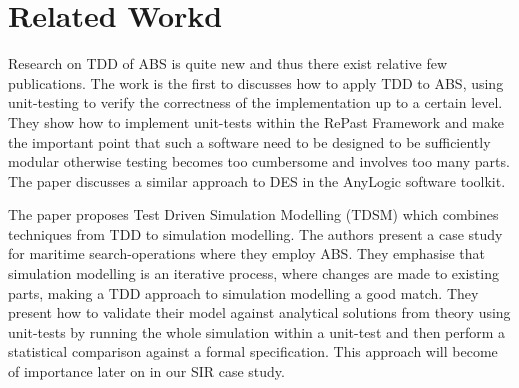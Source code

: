 \section{Related Workd}
\label{sec:related}

Research on TDD of ABS is quite new and thus there exist relative few publications. The work \cite{collier_test-driven_2013} is the first to discusses how to apply TDD to ABS, using unit-testing to verify the correctness of the implementation up to a certain level. They show how to implement unit-tests within the RePast Framework \cite{north_complex_2013} and make the important point that such a software need to be designed to be sufficiently modular otherwise testing becomes too cumbersome and involves too many parts. The paper \cite{asta_investigation_2014} discusses a similar approach to DES in the AnyLogic software toolkit. 

The paper \cite{onggo_test-driven_2016} proposes Test Driven Simulation Modelling (TDSM) which combines techniques from TDD to simulation modelling. The authors present a case study for maritime search-operations where they employ ABS. They emphasise that simulation modelling is an iterative process, where changes are made to existing parts, making a TDD approach to simulation modelling a good match. They present how to validate their model against analytical solutions from theory using unit-tests by running the whole simulation within a unit-test and then perform a statistical comparison against a formal specification. This approach will become of importance later on in our SIR case study.


